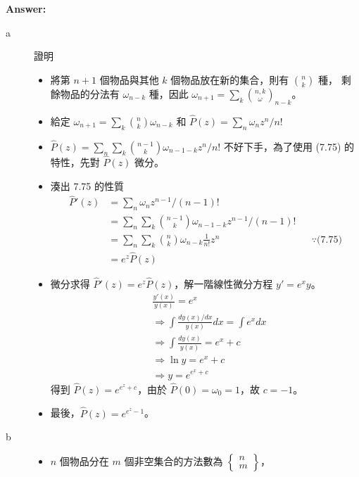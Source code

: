 \documentclass[11pt]{article}
\renewcommand\part[1]{\vspace{.10in}\textbf{#1}}
\begin{document}
\part{Answer:}

\begin{description}
	\item[a] 證明
		\begin{itemize}
			\item 將第 $n+1$ 個物品與其他 $k$ 個物品放在新的集合，則有 $\binom{n}{k}$ 種，
				剩餘物品的分法有 $\omega_{n-k}$ 種，因此 $\omega_{n+1} = \sum_k \binom{n, k} \omega_{n-k}$。
			\item 給定 $\omega_{n+1} = \sum_k \binom{n}{k} \omega_{n-k}$ 和
					$\widehat{P}(z) = \sum_n \omega_n z^n / n!$
			\item $\widehat{P}(z) = \sum_n \sum_k \binom{n-1}{k} \omega_{n-1-k} z^n / n!$ 
				不好下手，為了使用 (7.75) 的特性，先對 $\widehat{P}(z)$ 微分。
			\item 湊出 7.75 的性質
				\begin{align*}
					\widehat{P}'(z) 
					&= \sum_n \omega_{n} z^{n-1}/(n-1)! \\
					&= \sum_n \sum_k \binom{n-1}{k} \omega_{n-1-k} z^{n-1}/(n-1)! \\
					&= \sum_n \sum_k \binom{n}{k} \omega_{n-k} \frac{1}{n!} z^{n} 
						&& \because \text{(7.75)} \\
					&= e^z \widehat{P}(z)
				\end{align*}
			\item
				微分求得 $\widehat{P}'(z) = e^z \widehat{P}(z)$，解一階線性微分方程 $y' = e^x y$。
				\begin{align*}
					& \frac{y'(x)}{y(x)} = e^x \\
					& \Rightarrow \int \frac{d y(x) / dx}{y(x)} dx = \int e^x dx \\
					& \Rightarrow \int \frac{d y(x)}{y(x)} = e^x + c \\
					& \Rightarrow \ln y = e^x + c\\
					& \Rightarrow y = e^{e^x + c}
				\end{align*}
				得到 $\widehat{P}(z) = e^{e^z+c}$，由於 $\widehat{P}(0)=\omega_0=1$，故 $c=-1$。
			\item 最後，$\widehat{P}(z) = e^{e^z-1}$。
		\end{itemize}
	\item[b]
		\begin{itemize}
			\item $n$ 個物品分在 $m$ 個非空集合的方法數為 $\begin{Bmatrix}n\\m\end{Bmatrix}$，

\end{itemize}
\end{description}
\end{document}
